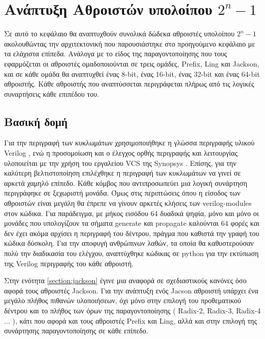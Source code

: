 \section{Ανάπτυξη Αθροιστών υπολοίπου $2^n-1$ }

Σε αυτό το κεφάλαιο θα αναπτυχθούν συνολικά δώδεκα αθροιστές υπολοίπου $2^n-1$
ακολουθώντας την αρχιτεκτονική που παρουσιάστηκε στο προηγούμενο κεφάλαιο 
με τα ελάχιστα επίπεδα. Ανάλογα με το είδος της παραγοντοποίησης που τους εφαρμόζεται 
οι αθροιστές ομαδοποιούνται σε τρεις ομάδες, Prefix, Ling και Jackson,
και σε κάθε ομάδα θα αναπτυχθεί ένας 8-bit, ένας 16-bit, ένας 32-bit και ένας 64-bit 
αθροιστής. Κάθε αθροιστής που αναπτύσσεται περιγράφεται πλήρως από τις λογικές 
συναρτήσεις κάθε επιπέδου του.






\subsection{Βασική δομή}
Για την περιγραφή των κυκλωμάτων χρησιμοποιήθηκε η γλώσσα περιγραφής υλικού Verilog \cite{1620780}, ενώ η προσομοίωση και ο έλεγχος ορθής περιγραφής και λειτουργίας υλοποιείται
με την χρήση του εργαλείου VCS της Synopsys \cite{vcs-synopsys}. Επίσης, για την καλύτερη
βελτιστοποίηση επιλέχθηκε η περιγραφή των κυκλωμάτων να γινεί σε αρκετά χαμηλό επίπεδο. Κάθε
κόμβος που αντιπροσωπεύει μια λογική συνάρτηση περιγράφηκε σε ξεχωριστή μονάδα. Όμως στις 
περιπτώσεις όπου η είσοδος των αθροιστών είναι μεγάλη θα έπρεπε να γίνουν αρκετές κλήσεις των 
verilog-modules στον κώδικα. Για παράδειγμα, με μήκος εισόδου 64 δυαδικά ψηφία, μόνο και μόνο οι 
μονάδες που υπολογίζουν τα σήματα generate και propagate καλούνται 64 φορές και δεν
έχει ακόμα αρχίσει η περιγραφή του δέντρου, πράγμα που καθιστά την γραφή του κώδικα 
δύσκολη. Για την αποφυγή ανθρώπινων λαθών, τα οποία θα καθυστερούσαν πολύ την 
διαδικασία του ελέγχου, αναπτύχθηκε κώδικας σε python για την εκτύπωση της Verilog
περιγραφής του κάθε αθροιστή.

Στην ενότητα \ref{section:jackson} έγινε μια αναφορά σε σχεδιαστικούς κανόνες όσο αφορά τους 
αθροιστές Jackson. Για την ανάπτυξη ενός Jacson αθροιστή υπάρχει ένα μεγάλο πλήθος πιθανών υλοποιήσεων,
όχι μόνο στην επιλογή του προθεματικού δέντρου και το πλήθος των όρων της παραγοντοποίησης ( Radix-2, 
Radix-3, Radix-4 ... ), κάτι που αφορά και τους αθροιστές Prefix και Ling, αλλά 
και στην επιλογή της συνάρτησης παραγοντοποίησης σε κάθε επίπεδο.

